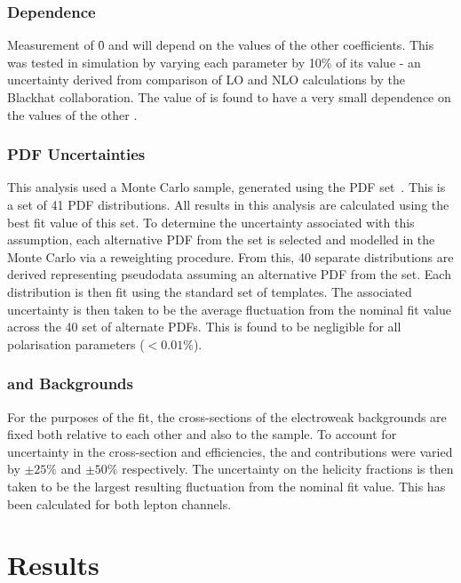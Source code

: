 \subsubsection{\Ai Dependence}
Measurement of \f0 and \fLmfR will depend on the values of the other \Ai
coefficients. This was tested in simulation by varying each parameter \Ai by
10\% of its value - an uncertainty derived from comparison of \ac{LO} and
\ac{NLO} calculations by the Blackhat collaboration. The value of \fLmfR is
found to have a very small dependence on the values of the other \Ai.

\subsubsection{\ac{PDF} Uncertainties}
This analysis used a \Wjets Monte Carlo sample, generated using the \cteqsixlone
\ac{PDF} set~\cite{cteq6l1}. This is a set of 41 \ac{PDF} distributions. All
results in this analysis are calculated using the best fit value of this set. To
determine the uncertainty associated with this assumption, each alternative
\ac{PDF} from the set is selected and modelled in the Monte Carlo via a
reweighting procedure. From this, 40 separate \LP distributions are derived
representing pseudodata assuming an alternative \ac{PDF} from the set. Each
distribution is then fit using the standard set of templates. The associated
uncertainty is then taken to be the average fluctuation from the nominal fit
value across the 40 set of alternate \acp{PDF}. This is found to be negligible
for all polarisation parameters ($< 0.01\%$).

\subsubsection{\Zjets and \ttbar Backgrounds}
For the purposes of the fit, the cross-sections of the electroweak backgrounds
are fixed both relative to each other and also to the \Wjets sample. To account
for uncertainty in the cross-section and efficiencies, the \Zjets and \ttbar
contributions were varied by $\pm 25\%$ and $\pm 50\%$ respectively. The
uncertainty on the helicity fractions is then taken to be the largest resulting
fluctuation from the nominal fit value. This has been calculated for both lepton
channels.







\section{Results}
\label{sec:wpol_results}

